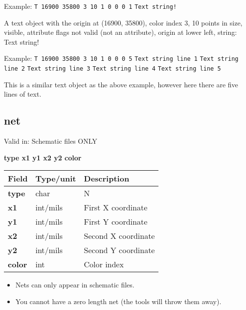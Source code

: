 \documentclass{article}
\begin{document}
Example:\newline 
{\tt T 16900 35800 3 10 1 0 0 0 1}\newline
{\tt Text string!}

A text object with the origin at (16900, 35800), color index 3, 10 points in
size, visible, attribute flags not valid (not an attribute), origin at lower
left, string: Text string! \newline

Example:\newline
{\tt T 16900 35800 3 10 1 0 0 0 5}\newline
{\tt Text string line 1}\newline
{\tt Text string line 2}\newline
{\tt Text string line 3}\newline
{\tt Text string line 4}\newline
{\tt Text string line 5}\newline

This is a similar text object as the above example, however here there are
five lines of text.

\subsection{net}

Valid in: Schematic files ONLY

{\bf type x1 y1 x2 y2 color}

\begin{table}[h]
\begin{tabular}{|l|l|l|} \hline
Field 		& Type/unit 	& Description \\ \hline 
\hline
{\bf type} 	& char 		& N \\ \hline
{\bf x1} 	& int/mils	& First X coordinate \\ \hline
{\bf y1} 	& int/mils	& First Y coordinate \\ \hline
{\bf x2} 	& int/mils	& Second X coordinate \\ \hline
{\bf y2} 	& int/mils	& Second Y coordinate \\ \hline
{\bf color} 	& int		& Color index \\ \hline
\end{tabular}
\end{table}

\begin{itemize}
\item Nets can only appear in schematic files.
\item You cannot have a zero length net (the tools will throw them away).
\end{itemize}
\end{document}
